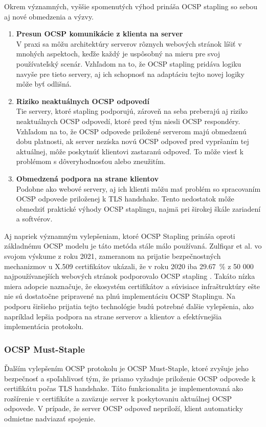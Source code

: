 \documentclass[12pt, twoside]{book}
\begin{document}
Okrem významných, vyššie spomenutých výhod prináša OCSP stapling so sebou aj nové 
obmedzenia a výzvy.

\begin{enumerate}
\item \textbf{Presun OCSP komunikácie z klienta na server} \\
V praxi sa môžu architektúry serverov rôznych webových stránok líšiť v mnohých aspektoch, keďže každý je uspôsobný na mieru pre svoj používateľský scenár. 
Vzhľadom na to, že OCSP stapling pridáva logiku navyše pre tieto servery, aj ich 
schopnosť na adaptáciu tejto novej logiky môže byť odlišná.

\item \textbf{Riziko neaktuálnych OCSP odpovedí} \\
Tie servery, ktoré stapling podporujú, zároveň na seba preberajú aj riziko neaktuálnych OCSP odpovedí, ktoré pred tým niesli  OCSP respondéry.
Vzhľadom na to, že OCSP odpovede priložené serverom majú obmedzenú dobu platnosti, ak server nezíska novú OCSP odpoveď pred vypršaním tej aktuálnej, môže poskytnúť klientovi zastaranú odpoveď. To môže viesť k problémom s dôveryhodnosťou alebo zneužitím.

\item \textbf{Obmedzená podpora na strane klientov} \\
Podobne ako webové servery, aj ich klienti môžu mať problém so spracovaním OCSP odpovede priloženej k TLS handshake. Tento nedostatok môže obmedziť praktické výhody OCSP staplingu, najmä pri širokej škále zariadení a softvérov.

\end{enumerate}

Aj napriek významným vylepšeniam, ktoré OCSP Stapling prináša oproti základnému OCSP modelu je táto metóda stále málo používaná. Zulfiqar et al. vo svojom výskume z roku 2021, zameranom na prijatie bezpečnostných mechanizmov u X.509 certifikátov ukázali, že v roku 2020 iba 29.67~\% z 50 000 najpoužívanejších webových stránok podporovalo OCSP stapling \cite{stapling_adoption}. Takáto nízka miera adopcie naznačuje, že ekosystém certifikátov a súvisiace infraštruktúry ešte nie sú dostatočne pripravené na plnú implementáciu OCSP Staplingu. Na podporu širšieho prijatia tejto technológie budú potrebné ďalšie vylepšenia, ako napríklad lepšia podpora na strane serverov a klientov a efektívnejšia implementácia protokolu.


\subsubsection{OCSP Must-Staple}
Ďalším vylepšením OCSP protokolu je OCSP Must-Staple, ktoré zvyšuje jeho bezpečnosť a spoľahlivosť tým, že priamo vyžaduje priloženie OCSP odpovede k  certifikátu počas TLS handshake. Táto funkcionalita je implementovaná ako rozšírenie v certifikáte a zaväzuje server k poskytovaniu aktuálnej OCSP odpovede. V prípade, že server OCSP odpoveď nepriloží, klient automaticky odmietne nadviazať spojenie.
\end{document}
